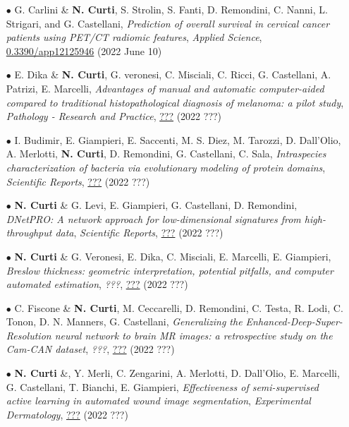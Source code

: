 \documentclass[a4paper,11pt]{article}
\begin{document}
\begin{itemize}
  \item[$\bullet$] G. Carlini \& \textbf{N. Curti}, S. Strolin, S. Fanti, D. Remondini, C. Nanni, L. Strigari, and G. Castellani, \emph{Prediction of overall survival in cervical cancer patients using PET/CT radiomic features}, \emph{Applied Science}, \url{0.3390/app12125946} (2022 June 10)


  \item[$\bullet$] E. Dika \& \textbf{N. Curti}, G. veronesi, C. Misciali, C. Ricci, G. Castellani, A. Patrizi, E. Marcelli, \emph{Advantages of manual and automatic computer-aided compared to traditional histopathological diagnosis of melanoma: a pilot study}, \emph{Pathology - Research and Practice}, \url{???} (2022 ???)

  \item[$\bullet$] I. Budimir, E. Giampieri, E. Saccenti, M. S. Diez, M. Tarozzi, D. Dall'Olio, A. Merlotti, \textbf{N. Curti}, D. Remondini, G. Castellani, C. Sala, \emph{Intraspecies characterization of bacteria via evolutionary modeling of protein domains}, \emph{Scientific Reports}, \url{???} (2022 ???)

  \item[$\bullet$] \textbf{N. Curti} \& G. Levi, E. Giampieri, G. Castellani, D. Remondini, \emph{DNetPRO: A network approach for low-dimensional signatures from high-throughput data}, \emph{Scientific Reports}, \url{???} (2022 ???)

  \item[$\bullet$] \textbf{N. Curti} \& G. Veronesi, E. Dika, C. Misciali, E. Marcelli, E. Giampieri, \emph{Breslow thickness: geometric interpretation, potential pitfalls, and computer automated estimation}, \emph{???}, \url{???} (2022 ???)

  \item[$\bullet$] C. Fiscone \& \textbf{N. Curti}, M. Ceccarelli, D. Remondini, C. Testa, R. Lodi, C. Tonon, D. N. Manners, G. Castellani, \emph{Generalizing the Enhanced-Deep-Super-Resolution neural network to brain MR images: a retrospective study on the Cam-CAN dataset}, \emph{???}, \url{???} (2022 ???)

  \item[$\bullet$] \textbf{N. Curti} \&, Y. Merli, C. Zengarini, A. Merlotti, D. Dall'Olio, E. Marcelli, G. Castellani, T. Bianchi, E. Giampieri, \emph{Effectiveness of semi-supervised active learning in automated wound image segmentation}, \emph{Experimental Dermatology}, \url{???} (2022 ???)


\end{itemize}
\end{document}
